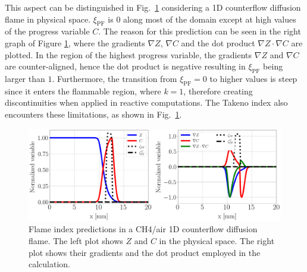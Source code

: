 \documentclass[preprint,12pt,authoryear]{elsarticle}
\begin{document}
This aspect can be distinguished in Fig.~\ref{fig:flame_1D_flame_index} considering a 1D counterflow diffusion flame in physical space.
$\xi_\mathrm{PF}$ is $0$ along most of the domain except at high values of the progress variable $C$. The reason for this prediction can be seen in the right graph of Figure \ref{fig:flame_1D_flame_index}, where the gradients $\nabla Z$, $\nabla C$ and the dot product $\nabla Z \cdot \nabla C$ are plotted. In the region of the highest progress variable, the gradients $\nabla Z$ and $\nabla C$ are counter-aligned, hence the dot product is negative resulting in $\xi_\mathrm{PF}$ being larger than $1$. Furthermore, the transition from $\xi_\mathrm{PF} = 0$ to higher values is steep since it enters the flammable region, where $k = 1$, therefore creating discontinuities when applied in reactive computations. 
The Takeno index also encounters these limitations, as shown in Fig.~\ref{fig:flame_1D_flame_index}.




\begin{figure}[h!]
	\includegraphics[scale=0.25]{./figures/flame_1D_flame_index}
	\caption{Flame index predictions in a CH4/air 1D counterflow diffusion flame. The left plot shows $Z$ and $C$ in the physical space. The right plot shows their gradients and the dot product employed in the calculation.} 
	\label{fig:flame_1D_flame_index}
\end{figure}
\end{document}

